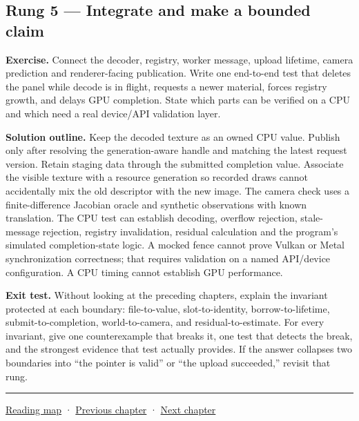 \subsection{Rung 5 --- Integrate and make a bounded claim}\label{02-foundations-ii-ch038-rung-5-integrate-and-make-a-bounded-claim}

\textbf{Exercise.} Connect the decoder, registry, worker message, upload lifetime, camera prediction and renderer-facing publication. Write one end-to-end test that deletes the panel while decode is in flight, requests a newer material, forces registry growth, and delays GPU completion. State which parts can be verified on a CPU and which need a real device/API validation layer.

\textbf{Solution outline.} Keep the decoded texture as an owned CPU value. Publish only after resolving the generation-aware handle and matching the latest request version. Retain staging data through the submitted completion value. Associate the visible texture with a resource generation so recorded draws cannot accidentally mix the old descriptor with the new image. The camera check uses a finite-difference Jacobian oracle and synthetic observations with known translation. The CPU test can establish decoding, overflow rejection, stale-message rejection, registry invalidation, residual calculation and the program's simulated completion-state logic. A mocked fence cannot prove Vulkan or Metal synchronization correctness; that requires validation on a named API/device configuration. A CPU timing cannot establish GPU performance.

\textbf{Exit test.} Without looking at the preceding chapters, explain the invariant protected at each boundary: file-to-value, slot-to-identity, borrow-to-lifetime, submit-to-completion, world-to-camera, and residual-to-estimate. For every invariant, give one counterexample that breaks it, one test that detects the break, and the strongest evidence that test actually provides. If the answer collapses two boundaries into ``the pointer is valid'' or ``the upload succeeded,'' revisit that rung.

\begin{center}\rule{0.5\linewidth}{0.5pt}\end{center}

\hyperref[volume-reading-map]{Reading map} · \hyperref[02-foundations-ii-ch037]{Previous chapter} · \hyperref[02-foundations-ii-ch039]{Next chapter}
